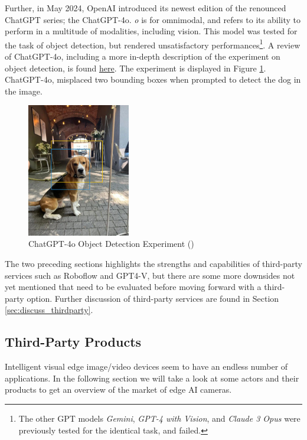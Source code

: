 Further, in May 2024, OpenAI introduced its newest edition of the renounced ChatGPT series; the ChatGPT-4o. \textit{o} is for omnimodal, and refers to its ability to perform in a multitude of modalities, including vision. This model was tested for the task of object detection, but rendered unsatisfactory performances\footnote{The other GPT models \textit{Gemini}, \textit{GPT-4 with Vision}, and \textit{Claude 3 Opus} were previously tested for the identical task, and failed.}. A review of ChatGPT-4o, including a more in-depth description of the experiment on object detection, is found \href{https://blog.roboflow.com/gpt-4o-vision-use-cases/}{here}. The experiment is displayed in Figure \ref{fig:gpt4o_experiment}. ChatGPT-4o, misplaced two bounding boxes when prompted to detect the dog in the image.

\begin{figure}[H]
    \centering
    \includegraphics[width=0.4\textwidth]{Images/gpt4o_object_detection_just_dog.jpg}
    \caption{\centering ChatGPT-4o Object Detection Experiment (\cite{ue2024chatgpt4o})}
    \label{fig:gpt4o_experiment}
\end{figure}

The two preceding sections highlights the strengths and capabilities of third-party services such as Roboflow and GPT4-V, but there are some more downsides not yet mentioned that need to be evaluated before moving forward with a third-party option. Further discussion of third-party services are found in Section \ref{sec:discuss_thirdparty}.

\subsection{Third-Party Products}
\label{sec:thirdparty_products}
Intelligent visual edge image/video devices seem to have an endless number of applications. In the following section we will take a look at some actors and their products to get an overview of the market of edge AI cameras.

